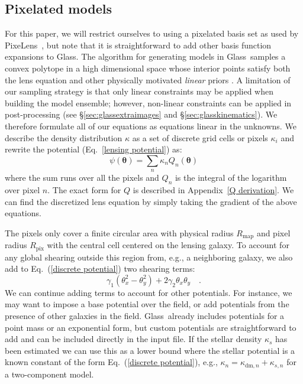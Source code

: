 \documentclass[galley,usenatbib]{mn2e}
\renewcommand{\vec}[1]{\ensuremath{\boldsymbol{#1}}}
\newcommand{\Glass}{{\sc Glass}}
\newcommand{\PixeLens}{{\sc PixeLens}}
\newcommand{\Rmap}{\ensuremath{R_\mathrm{map}}}
\newcommand{\Rpix}{\ensuremath{R_\mathrm{pix}}}
\newcommand{\eqnref}[1] {Eq.~(\ref{#1})}
\newcommand{\eqnrefp}[1] {(Eq.~\ref{#1})}
\newcommand{\secref}[1] {\S\ref{#1}}
\newcommand{\appref}[1] {Appendix~\ref{#1}}
\begin{document}
\subsection{Pixelated models}\label{sec:discrete}
For this paper, we will restrict ourselves to using a pixelated basis set as
used by \PixeLens\ \citep{Saha2004,2008ApJ...679...17C}, but note that it is
straightforward to add other basis function expansions to \Glass. The algorithm
for generating models in \Glass\ samples a convex polytope in a high
dimensional space whose interior points satisfy both the lens equation and
other physically motivated {\it linear} priors \citep{2012MNRAS.425.3077L}.
A limitation of our sampling strategy is that only linear constraints may
be applied when building the model ensemble; however, non-linear
constraints can be applied in post-processing (see
\secref{sec:glassextraimages} and \secref{sec:glasskinematics}). We
therefore formulate all of our equations as equations linear in the
unknowns. We describe the density distribution $\kappa$ as a set of
discrete grid cells or pixels $\kappa_i$ and rewrite the potential
\eqnrefp{lensing potential} as:
%
\begin{equation}
  \psi(\vec\theta) = \sum_n \kappa_n Q_n(\vec\theta)
  \label{discrete potential}
\end{equation}
%
where the sum runs over all the pixels and $Q_n$ is the integral of the
logarithm over pixel $n$. The exact form for $Q$ is described in \appref{Q
derivation}.  We can find the discretized lens equation by simply taking the
gradient of the above equations. 

The pixels only cover a finite circular area with physical radius $\Rmap$ and
pixel radius $\Rpix$ with the central cell centered on the lensing galaxy. To
account for any global shearing outside this region from, e.g., a neighboring
galaxy, we also add to \eqnref{discrete potential} two shearing terms:
%
\begin{equation}
\label{shear}
\gamma_1(\theta_x^2 - \theta_y^2) + 2\gamma_2\theta_x\theta_y\quad.
\end{equation}
%
We can continue adding terms to account for other potentials. For instance, we
may want to impose a base potential over the field, or add potentials from the
presence of other galaxies in the field. \Glass\ already includes potentials
for a point mass or an exponential form, but custom potentials are
straightforward to add and can be included directly in the input file.  If the
stellar density $\kappa_s$ has been estimated we can use this as a lower bound
where the stellar potential is a known constant of the form \eqnref{discrete
potential}, e.g., $\kappa_n = \kappa_{\mathrm{dm},n} + \kappa_{s,n}$ for a
two-component model.
\end{document}
